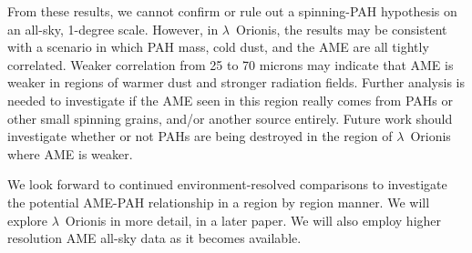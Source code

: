 \documentclass[preprint2,longabstract]{aastex}
\begin{document}
     From these results, we cannot confirm or rule out a spinning-PAH hypothesis on an all-sky, 1-degree scale. However, in  $\lambda$~Orionis, the results may be consistent with a scenario in which PAH mass, cold dust, and the AME are all tightly correlated. Weaker correlation from 25 to 70 microns may indicate that AME is weaker in regions of warmer dust and stronger radiation fields. Further analysis is needed to investigate if the AME seen in this region really comes from PAHs or other small spinning grains, and/or another source entirely.  Future work should investigate whether or not PAHs are being destroyed in the region of $\lambda$~Orionis where AME is weaker.
     
           We look forward to continued environment-resolved comparisons to investigate the potential AME-PAH relationship in a region by region manner. We will explore $\lambda$~Orionis in more detail, in a later paper. We will also employ higher resolution AME all-sky data as it becomes available.
       
       
       
       
\end{document}

